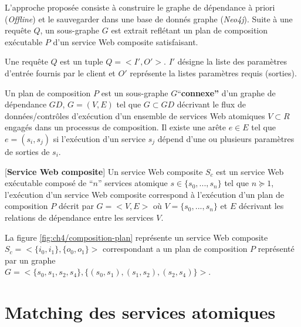   L'approche proposée consiste à construire le graphe de dépendance à
  priori (\textit{Offline}) et le sauvegarder dans une base de donnés
  graphe (\textit{Neo4j}). Suite à une requête $Q$, un sous-graphe $G$
  est extrait reflétant un plan de composition exécutable $P$ d'un
  service Web composite satisfaisant.

  \begin{mydef}
    Une requête $Q$ est un tuple $Q = <I', O'>$. $I'$ désigne la liste
    des paramètres d'entrée fournis par le client et $O'$ représente
    la listes paramètres requis (sorties).
  \end{mydef}

  

  \begin{mydef}
    Un plan de composition $P$ est un sous-graphe
    $G$``\textbf{connexe''} d'un graphe de dépendance $GD$, $G=(V,E)$
    tel que $G \subset GD$ décrivant le flux de données/contrôles
    d'exécution d'un ensemble de services Web atomiques $V \subset R$
    engagés dans un processus de composition. Il existe une arête $e
    \in E$ tel que $e = (s_i, s_j)$ si l'exécution d'un service $s_j$
    dépend d'une ou plusieurs paramètres de sorties de $s_i$.
  \end{mydef}

  \begin{mydef}\label{def:ch4/sc}[\textbf{Service Web composite}] Un
    service Web composite $S_c$ est un service Web exécutable composé
    de ``$n$'' services atomique $s \in \{s_0,..., s_n\}$ tel que $n
    \succeq 1$, l'exécution d'un service Web composite correspond à
    l'exécution d'un plan de composition $P$ décrit par $G=<V,E>$ où
    $V = \{s_0, ..., s_n\}$ et $E$ décrivant les relations de
    dépendance entre les services $V$.
  \end{mydef}

  La figure \ref{fig:ch4/composition-plan} représente un service Web
  composite $S_c = <\{i_0, i_1\}, \{o_0, o_1\}>$ correspondant a un
  plan de composition $P$ représenté par un graphe\\ $G =<\{s_0, s_1,
  s_2, s_4\}, \{(s_0, s_1), (s_1, s_2), (s_2, s_4)\}>$.

\section{Matching des services  atomiques}
\label{sec:ch4/matching}

